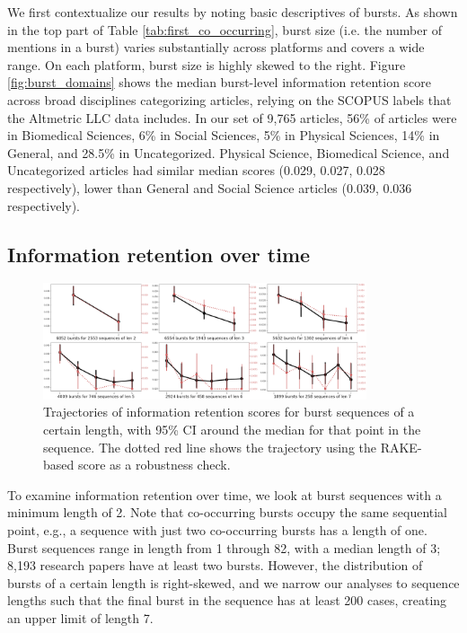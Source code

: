 \documentclass[letterpaper]{article} %
\begin{document}
We first contextualize our results by noting basic descriptives of bursts.
As shown in the top part of Table \ref{tab:first_co_occurring}, burst size (i.e. the number of mentions in a burst) varies substantially across platforms and covers a wide range. On each platform, burst size is highly skewed to the right. Figure \ref{fig:burst_domains} shows the median burst-level information retention score across broad disciplines categorizing articles, relying on the SCOPUS labels that the Altmetric LLC data includes. In our set of 9,765 articles, 56\% of articles were in Biomedical Sciences, 6\% in Social Sciences, 5\% in Physical Sciences, 14\% in General, and 28.5\% in Uncategorized. Physical Science, Biomedical Science, and Uncategorized articles had similar median scores (0.029, 0.027, 0.028 respectively), lower than General and Social Science articles (0.039, 0.036 respectively).

\subsection{Information retention over time}

\begin{figure}[ht]
\centering
\includegraphics[width=0.85\textwidth]{figs/trajectory_overall.png}
\caption{Trajectories of information retention scores for burst sequences of a certain length, with 95\% CI around the median for that point in the sequence. The dotted red line shows the trajectory using the RAKE-based score as a robustness check.}
\label{fig:sequences2_9}
\end{figure}

To examine information retention over time, we look at burst sequences with a minimum length of 2. Note that co-occurring bursts occupy the same sequential point, e.g., a sequence with just two co-occurring bursts has a length of one. Burst sequences range in length from 1 through 82, with a median length of 3; 8,193 research papers have at least two bursts. However, the distribution of bursts of a certain length is right-skewed, and we narrow our analyses to sequence lengths such that the final burst in the sequence has at least 200 cases, creating an upper limit of length 7.
\end{document}
